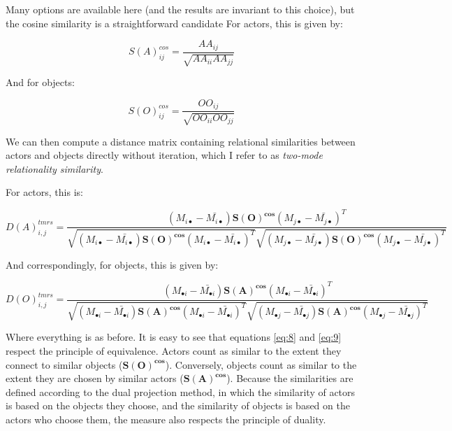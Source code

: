 \documentclass[a4paper,fleqn]{cas-sc}
\begin{document}
Many options are available here (and the results are invariant to this choice), but the cosine similarity is a straightforward candidate \citep{goodman1996single} For actors, this is given by:

\begin{equation}
    S(A)^{cos}_{ij} = \frac{AA_{ij}}{\sqrt{AA_{ii}AA_{jj}}}
    \label{eq:6}
\end{equation}

And for objects:

\begin{equation}
    S(O)^{cos}_{ij} = \frac{OO_{ij}}{\sqrt{OO_{ii}OO_{jj}}}
    \label{eq:7}
\end{equation}

We can then compute a distance matrix containing relational similarities between actors and objects directly without iteration, which I refer to as \textit{two-mode relationality similarity}. 

For actors, this is:

\begin{equation}
    D(A)^{tmrs}_{i,j} = 
    \frac{
    (M_{i\bullet} - \bar{M_{i\bullet}})
    \mathbf{S(O)^{cos}}
    (M_{j\bullet} - \bar{M_{j\bullet}})^T
    }
    {
    \sqrt{
    (M_{i\bullet} - \bar{M_{i\bullet}})
    \mathbf{S(O)^{cos}}
    (M_{i\bullet} - \bar{M_{i\bullet}})^T
    }
    \sqrt{
    (M_{j\bullet} - \bar{M_{j\bullet}})
    \mathbf{S(O)^{cos}}
    (M_{j\bullet} - \bar{M_{j\bullet}})^T
        }
    }
    \label{eq:8}
\end{equation}

And correspondingly, for objects, this is given by:

\begin{equation}
    D(O)^{tmrs}_{i,j} = 
    \frac{
    (M_{\bullet i} - \bar{M_{\bullet i}})
    \mathbf{S(A)^{cos}}
    (M_{\bullet i} - \bar{M_{\bullet i}})^T
    }
    {
    \sqrt{
    (M_{\bullet i} - \bar{M_{\bullet i}})
    \mathbf{S(A)^{cos}}
    (M_{\bullet i} - \bar{M_{\bullet i}})^T
    }
    \sqrt{
    (M_{\bullet j} - \bar{M_{\bullet j}})
    \mathbf{S(A)^{cos}}
    (M_{\bullet j} - \bar{M_{\bullet j}})^T
        }
    }
    \label{eq:9}
\end{equation}

Where everything is as before. It is easy to see that equations \ref{eq:8} and \ref{eq:9} respect the principle of equivalence. Actors count as similar to the extent they connect to similar objects ($\mathbf{S(O)^{cos}}$). Conversely, objects count as similar to the extent they are chosen by similar actors ($ \mathbf{S(A)^{cos}}$). Because the similarities are defined according to the dual projection method, in which the similarity of actors is based on the objects they choose, and the similarity of objects is based on the actors who choose them, the measure also respects the principle of duality.
\end{document}
